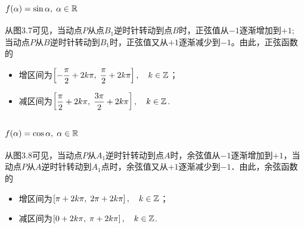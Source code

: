 \subsection{$f(\alpha)=\sin\alpha,\; \alpha\in\mathbb{R}$}
从图3.7可见，当动点$P$从点$B_1$逆时针转动到点$B$时，正弦值从$-1$逐渐增加到$+1$; 当动点$P$从$B$逆时针转动到$B_1$时，正弦值又从$+1$逐渐减少到$-1$。由此，正弦函数的
\begin{itemize}
    \item 增区间为$\left[-\dfrac{\pi}{2}+2k\pi,\; \dfrac{\pi}{2}+2k\pi\right],\quad k\in\mathbb{Z}$；
    \item 减区间为$\left[\dfrac{\pi}{2}+2k\pi,\; \dfrac{3\pi}{2}+2k\pi\right],\quad k\in\mathbb{Z}$.
\end{itemize}

\subsection{$f(\alpha)=\cos\alpha,\; \alpha\in\mathbb{R}$}

从图3.8可见，当动点$P$从$A_1$逆时针转动到点$A$时，余弦值从$-1$逐渐增加到$+1$，当动点$P$从$A$逆时针转动到$A_1$点时，余弦值又从$+1$逐渐减少到$-1$．由此，余弦函数的
\begin{itemize}
    \item 增区间为$\left[\pi+2k\pi,\; 2\pi+2k\pi\right],\quad k\in\mathbb{Z}$；
    \item 减区间为$\left[0+2k\pi,\; \pi+2k\pi\right],\quad k\in\mathbb{Z}$.
\end{itemize}


\begin{example}
    
\end{example}

\begin{analyze}
    
\end{analyze}

\begin{solution}
    
\end{solution}



\begin{example}
    
\end{example}

\begin{analyze}
    
\end{analyze}

\begin{solution}
    
\end{solution}



